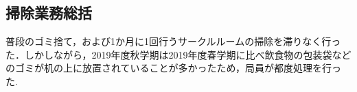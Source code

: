 \subsection*{掃除業務総括}

普段のゴミ捨て，および1か月に1回行うサークルルームの掃除を滞りなく行った．しかしながら，2019年度秋学期は2019年度春学期に比べ飲食物の包装袋などのゴミが机の上に放置されていることが多かったため，局員が都度処理を行った.
